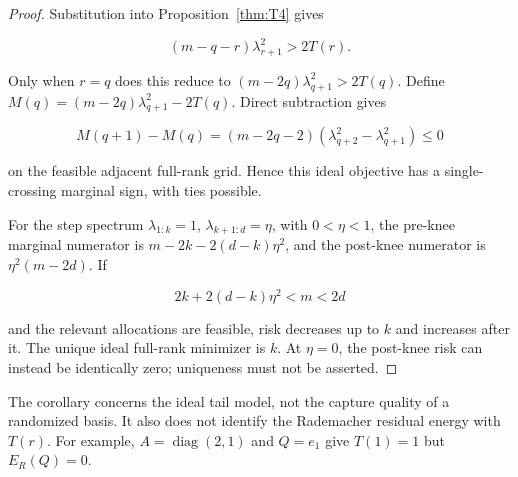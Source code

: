 \begin{proof}
Substitution into Proposition~\ref{thm:T4} gives


\begin{equation}
\boxed{(m-q-r)\lambda_{r+1}^2>2T(r).}
\end{equation}


Only when $r=q$ does this reduce to $(m-2q)\lambda_{q+1}^2>2T(q)$. Define $M(q)=(m-2q)\lambda_{q+1}^2-2T(q)$. Direct subtraction gives


\begin{equation}
M(q+1)-M(q)=(m-2q-2)(\lambda_{q+2}^2-\lambda_{q+1}^2)\le0
\end{equation}


on the feasible adjacent full-rank grid. Hence this ideal objective has a single-crossing marginal sign, with ties possible.


For the step spectrum $\lambda_{1:k}=1$, $\lambda_{k+1:d}=\eta$, with $0<\eta<1$, the pre-knee marginal numerator is $m-2k-2(d-k)\eta^2$, and the post-knee numerator is $\eta^2(m-2d)$. If


\begin{equation}
2k+2(d-k)\eta^2<m<2d
\end{equation}


and the relevant allocations are feasible, risk decreases up to $k$ and increases after it. The unique ideal full-rank minimizer is $k$. At $\eta=0$, the post-knee risk can instead be identically zero; uniqueness must not be asserted.

\end{proof}


The corollary concerns the ideal tail model, not the capture quality of a randomized basis. It also does not identify the Rademacher residual energy with $T(r)$. For example, $A=\operatorname{diag}(2,1)$ and $Q=e_1$ give $T(1)=1$ but $E_R(Q)=0$.
